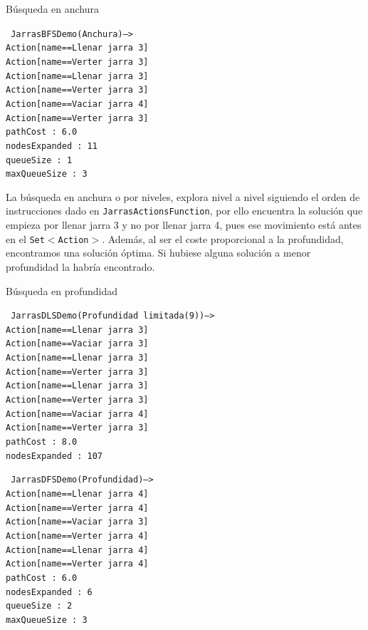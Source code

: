\documentclass[11pt, a4paper, spanish, openright, twoside]{book}
\begin{document}
\begin{section}{Búsqueda en anchura}
	
\texttt{
	JarrasBFSDemo(Anchura)--> \\
	Action[name==Llenar jarra 3]		\\
	Action[name==Verter jarra 3] 		\\ 
	Action[name==Llenar jarra 3]		\\
	Action[name==Verter jarra 3]		\\
	Action[name==Vaciar jarra 4]		\\
	Action[name==Verter jarra 3]		\\
	pathCost : 6.0					\\
	nodesExpanded : 11			\\
	queueSize : 1					\\
	maxQueueSize : 3				
}

La búsqueda en anchura o por niveles, explora nivel a nivel siguiendo el orden de instrucciones dado en \texttt{JarrasActionsFunction}, por ello encuentra la solución que 
empieza por llenar jarra 3 y no por llenar jarra 4, pues ese movimiento está antes en el \texttt{Set$<$Action$>$}. Además, al ser el coste proporcional a la profundidad, encontramos una solución óptima.
 Si hubiese alguna solución a menor profundidad la habría encontrado.

\end{section}

\begin{section}{Búsqueda en profundidad}

\texttt{
	JarrasDLSDemo(Profundidad limitada(9))-->	\\
	Action[name==Llenar jarra 3]		\\
	Action[name==Vaciar jarra 3]		\\
	Action[name==Llenar jarra 3]		\\
	Action[name==Verter jarra 3]		\\
	Action[name==Llenar jarra 3]		\\
	Action[name==Verter jarra 3]		\\
	Action[name==Vaciar jarra 4]		\\
	Action[name==Verter jarra 3]		\\
	pathCost : 8.0					\\
	nodesExpanded : 107			\\
}

\texttt{
	JarrasDFSDemo(Profundidad)-->	\\
	Action[name==Llenar jarra 4]		\\
	Action[name==Verter jarra 4]		\\
	Action[name==Vaciar jarra 3]		\\
	Action[name==Verter jarra 4]		\\
	Action[name==Llenar jarra 4]		\\
	Action[name==Verter jarra 4]		\\
	pathCost : 6.0					\\
	nodesExpanded : 6				\\
	queueSize : 2					\\
	maxQueueSize : 3				
}

\end{section}
\end{document}
